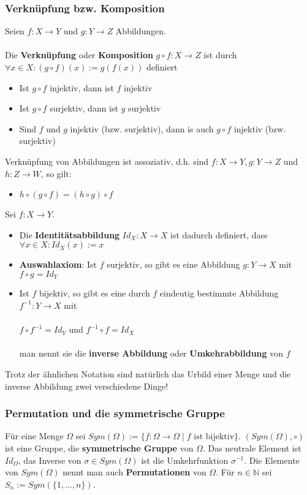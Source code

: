 \documentclass[titlepage]{article}
\newcommand{\N}{\mathbb{N}}
\newcommand{\1}{\mathbb{1}}
\newcommand{\0}{\mathbb{0}}
\begin{document}
				\subsubsection{Verknüpfung bzw. Komposition}
					Seien $f:X\rightarrow Y$ und $g:Y\rightarrow Z$ Abbildungen.\\\\
					Die \textbf{Verknüpfung} oder \textbf{Komposition} $g\circ f:X\rightarrow Z$ ist durch $\forall x\in X:(g\circ f)(x):=g(f(x))$ definiert
					\begin{itemize}
						\item Ist $g\circ f$ injektiv, dann ist $f$ injektiv
						\item Ist $g\circ f$ surjektiv, dann ist $g$ surjektiv
						\item Sind $f$ und $g$ injektiv (bzw. surjektiv), dann is auch $g\circ f$ injektiv (bzw. surjektiv)
					\end{itemize}
					Verknüpfung von Abbildungen ist assoziativ, d.h. sind $f:X\rightarrow Y,g:Y\rightarrow Z$ und $h:Z\rightarrow W$, so gilt:
					\begin{itemize}
						\item $h\circ(g\circ f)=(h\circ g)\circ f$
					\end{itemize}
					Sei $f:X\rightarrow Y$.
					\begin{itemize}
						\item Die \textbf{Identitätsabbildung} $Id_X:X\rightarrow X$ ist dadurch definiert, dass $\forall x\in X:Id_X(x):=x$
						\item \textbf{Auswahlaxiom}: Ist $f$ surjektiv, so gibt es eine Abbildung $g:Y\rightarrow X$ mit $f\circ g=Id_Y$
						\item Ist $f$ bijektiv, so gibt es eine durch $f$ eindeutig bestimmte Abbildung $f^{-1}:Y\rightarrow X$ mit\\\\ $f\circ f^{-1}=Id_Y$ und $f^{-1}\circ f=Id_X$\\\\man nennt sie die \textbf{inverse Abbildung} oder \textbf{Umkehrabbildung} von $f$
					\end{itemize}
					Trotz der ähnlichen Notation sind natürlich das Urbild einer Menge und die inverse Abbildung zwei verschiedene Dinge!
				\subsubsection{Permutation und die symmetrische Gruppe}
					Für eine Menge $\Omega$ sei $Sym(\Omega):=\{f:\Omega\rightarrow\Omega\mid f\text{ ist bijektiv}\}$. $(Sym(\Omega),\circ)$ ist eine Gruppe, die \textbf{symmetrische Gruppe} von $\Omega$. Das neutrale Element ist $Id_\Omega$, das Inverse von $\sigma\in Sym(\Omega)$ ist die Umkehrfunktion $\sigma^{-1}$. Die Elemente von $Sym(\Omega)$ nennt man auch \textbf{Permutationen} von $\Omega$. Für $n\in\N$ sei $S_n:=Sym(\{1,...,n\})$.
\end{document}
